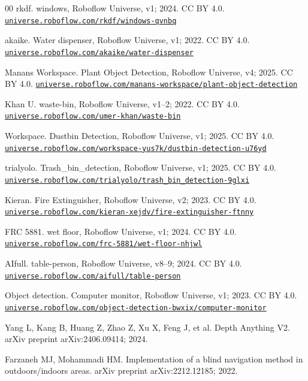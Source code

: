 \documentclass[3p,times,procedia]{elsarticle}
\begin{document}
\begin{thebibliography}{00}
rkdf. windows, Roboflow Universe, v1; 2024. CC BY 4.0. \href{https://universe.roboflow.com/rkdf/windows-qvnbq}{\nolinkurl{universe.roboflow.com/rkdf/windows-qvnbq}}

akaike. Water dispenser, Roboflow Universe, v1; 2022. CC BY 4.0. \href{https://universe.roboflow.com/akaike/water-dispenser}{\nolinkurl{universe.roboflow.com/akaike/water-dispenser}}

Manans Workspace. Plant Object Detection, Roboflow Universe, v4; 2025. CC BY 4.0. \href{https://universe.roboflow.com/manans-workspace/plant-object-detection}{\nolinkurl{universe.roboflow.com/manans-workspace/plant-object-detection}}

Khan U. waste-bin, Roboflow Universe, v1--2; 2022. CC BY 4.0. \href{https://universe.roboflow.com/umer-khan/waste-bin}{\nolinkurl{universe.roboflow.com/umer-khan/waste-bin}}

Workspace. Dustbin Detection, Roboflow Universe, v1; 2025. CC BY 4.0. \href{https://universe.roboflow.com/workspace-yus7k/dustbin-detection-u76yd}{\nolinkurl{universe.roboflow.com/workspace-yus7k/dustbin-detection-u76yd}}

trialyolo. Trash\_bin\_detection, Roboflow Universe, v1; 2025. CC BY 4.0. \href{https://universe.roboflow.com/trialyolo/trash_bin_detection-9glxi}{\nolinkurl{universe.roboflow.com/trialyolo/trash_bin_detection-9glxi}}

Kieran. Fire Extinguisher, Roboflow Universe, v2; 2023. CC BY 4.0. \href{https://universe.roboflow.com/kieran-xejdv/fire-extinguisher-ftnny}{\nolinkurl{universe.roboflow.com/kieran-xejdv/fire-extinguisher-ftnny}}

FRC 5881. wet floor, Roboflow Universe, v1; 2024. CC BY 4.0. \href{https://universe.roboflow.com/frc-5881/wet-floor-nhjwl}{\nolinkurl{universe.roboflow.com/frc-5881/wet-floor-nhjwl}}

AIfull. table-person, Roboflow Universe, v8--9; 2024. CC BY 4.0. \href{https://universe.roboflow.com/aifull/table-person}{\nolinkurl{universe.roboflow.com/aifull/table-person}}

Object detection. Computer monitor, Roboflow Universe, v1; 2023. CC BY 4.0. \href{https://universe.roboflow.com/object-detection-bwxix/computer-monitor}{\nolinkurl{universe.roboflow.com/object-detection-bwxix/computer-monitor}}

Yang L, Kang B, Huang Z, Zhao Z, Xu X, Feng J, et al. Depth Anything V2.
arXiv preprint arXiv:2406.09414; 2024.

Farzaneh MJ, Mohammadi HM. Implementation of a blind navigation method in
outdoors/indoors areas. arXiv preprint arXiv:2212.12185; 2022.

\end{thebibliography}
\end{document}
